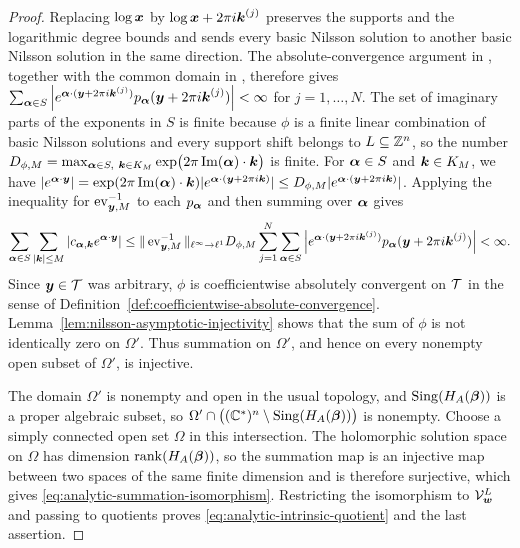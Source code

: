 \begin{proof}
	Replacing \(\log\boldsymbol{x}\) by \(\log\boldsymbol{x}+2\pi i\boldsymbol{k}^{(j)}\) preserves the supports and the logarithmic degree bounds and sends every basic Nilsson solution to another basic Nilsson solution in the same direction.
	The absolute-convergence argument in \cite[Theorem~6.2]{DMM12}, together with the common domain in \cite[Theorem~6.4]{DMM12}, therefore gives \(\sum_{\boldsymbol{\alpha}\in S} \left| e^{\boldsymbol{\alpha}\cdot(\boldsymbol{y}+2\pi i\boldsymbol{k}^{(j)})} p_{\boldsymbol{\alpha}}(\boldsymbol{y}+2\pi i\boldsymbol{k}^{(j)}) \right| < \infty\) for \(j=1,\ldots,N\).
	The set of imaginary parts of the exponents in \(S\) is finite because \(\phi\) is a finite linear combination of basic Nilsson solutions and every support shift belongs to \(L\subseteq\mathbb Z^n\), so the number \(D_{\phi,M}=\max_{\boldsymbol{\alpha}\in S,\ \boldsymbol{k}\in K_M}\exp\bigl(2\pi\operatorname{Im}(\boldsymbol{\alpha})\cdot\boldsymbol{k}\bigr)\) is finite.
	For \(\boldsymbol{\alpha}\in S\) and \(\boldsymbol{k}\in K_M\), we have \(|e^{\boldsymbol{\alpha}\cdot\boldsymbol{y}}|=\exp(2\pi\operatorname{Im}(\boldsymbol{\alpha})\cdot\boldsymbol{k})|e^{\boldsymbol{\alpha}\cdot(\boldsymbol{y}+2\pi i\boldsymbol{k})}|\leq D_{\phi,M}|e^{\boldsymbol{\alpha}\cdot(\boldsymbol{y}+2\pi i\boldsymbol{k})}|\).
	Applying the inequality for \(\operatorname{ev}_{\boldsymbol{y},M}^{-1}\) to each \(p_{\boldsymbol{\alpha}}\) and then summing over \(\boldsymbol{\alpha}\) gives
	\[
		\sum_{\boldsymbol{\alpha}\in S}
		\sum_{|\boldsymbol{k}|\leq M}
		\left|
		c_{\boldsymbol{\alpha},\boldsymbol{k}}e^{\boldsymbol{\alpha}\cdot\boldsymbol{y}}
		\right|
		\leq
		\|\operatorname{ev}_{\boldsymbol{y},M}^{-1}\|_{\ell^\infty\to\ell^1}D_{\phi,M}
		\sum_{j=1}^{N}
		\sum_{\boldsymbol{\alpha}\in S}
		\left|
		e^{\boldsymbol{\alpha}\cdot(\boldsymbol{y}+2\pi i\boldsymbol{k}^{(j)})}
		p_{\boldsymbol{\alpha}}(\boldsymbol{y}+2\pi i\boldsymbol{k}^{(j)})
		\right|
		<
		\infty.
	\]
	Since \(\boldsymbol{y}\in\mathcal T\) was arbitrary, \(\phi\) is coefficientwise absolutely convergent on \(\mathcal T\) in the sense of Definition~\ref{def:coefficientwise-absolute-convergence}.
	Lemma~\ref{lem:nilsson-asymptotic-injectivity} shows that the sum of \(\phi\) is not identically zero on \(\Omega'\).
	Thus summation on \(\Omega'\), and hence on every nonempty open subset of \(\Omega'\), is injective.

	The domain \(\Omega'\) is nonempty and open in the usual topology, and \(\operatorname{Sing}(H_A(\boldsymbol{\beta}))\) is a proper algebraic subset, so \(\Omega'\cap\bigl((\mathbb C^*)^n\setminus\operatorname{Sing}(H_A(\boldsymbol{\beta}))\bigr)\) is nonempty.
	Choose a simply connected open set \(\Omega\) in this intersection.
	The holomorphic solution space on \(\Omega\) has dimension \(\operatorname{rank}(H_A(\boldsymbol{\beta}))\), so the summation map is an injective map between two spaces of the same finite dimension and is therefore surjective, which gives \eqref{eq:analytic-summation-isomorphism}.
	Restricting the isomorphism to \(\mathcal V_{\boldsymbol{w}}^{L}\) and passing to quotients proves \eqref{eq:analytic-intrinsic-quotient} and the last assertion.
\end{proof}

